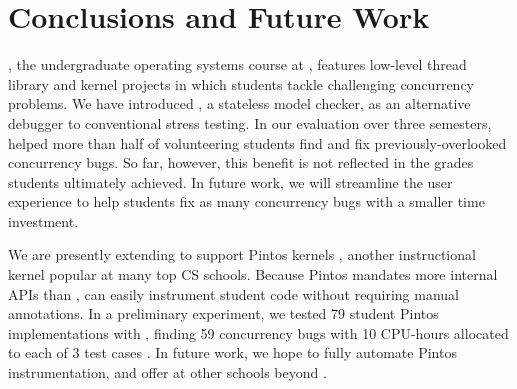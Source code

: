 \documentclass{sig-alternate-05-2015}
\begin{document}


\printccsdesc







\section{Conclusions and Future Work}
\label{sec:warpzone}

\fourten, the undergraduate operating systems course at \cmu,
features low-level thread library and kernel projects
in which students tackle challenging concurrency problems.
We have introduced \landslide, a stateless model checker,
as an alternative debugger to conventional stress testing.
In our evaluation over three semesters,
\landslide helped more than half of volunteering students find and fix previously-overlooked concurrency bugs.
So far, however, this benefit is not reflected in the grades students ultimately achieved.
In future work, we will streamline the user experience to help students fix as many concurrency bugs with a smaller time investment.

We are presently extending \landslide to support Pintos kernels \cite{pintos},
another instructional kernel popular at many top CS schools.
Because Pintos mandates more internal APIs than \pebbles,
\landslide can easily instrument student code without requiring manual annotations.
In a preliminary experiment, we tested 79 student Pintos implementations with \landslide,
finding 59 concurrency bugs with 10 CPU-hours allocated to each of 3 test cases \cite{quicksand-anonymized}.
In future work, we hope to fully automate Pintos instrumentation, and offer \landslide at other schools beyond \cmu.
\end{document}
